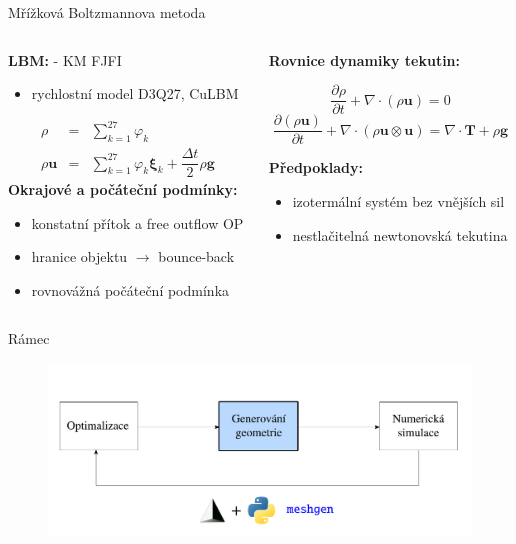 \documentclass[aspectratio=169,xcolor=dvipsnames]{beamer}
\newcommand{\vect}[1]{\mathbf{#1}}
\begin{document}
\begin{frame}{Mřížková Boltzmannova metoda}
	\begin{columns}[T] %
		\begin{column}{.45\textwidth}
			\textbf{LBM:} - KM FJFI\\
			\begin{itemize}
				\item rychlostní model D3Q27, CuLBM
			\end{itemize}
		\begin{eqnarray*}
			\rho &=& \sum_{k=1}^{27} \varphi_{k}\\
			\rho \vect{u} &=& \sum_{k=1}^{27} \varphi_{k} \boldsymbol{\xi}_{k} + \dfrac{\Delta t}{2} \rho \boldsymbol{g}
		\end{eqnarray*}
			\textbf{Okrajové a počáteční podmínky:}\\
			\begin{itemize}
				\item konstatní přítok a free outflow OP
				\item hranice objektu $ \rightarrow $ bounce-back
				\item rovnovážná počáteční podmínka
			\end{itemize}
		\end{column}%
		\begin{column}{.5\textwidth}
			\textbf{Rovnice dynamiky tekutin:}
			\vspace{-13pt}
			\begin{center}
				$$\frac{\partial \rho}{\partial t} + \nabla \cdot (\rho \vect{u}) = 0 $$
				$$\frac{\partial (\rho \vect{u})}{\partial t} + \nabla \cdot (\rho \vect{u} \otimes \vect{u}) = \nabla \cdot \mathbf{T} + \rho \boldsymbol{g}$$
			\end{center}%
			\vspace{11pt}
			\textbf{Předpoklady:}\\[2pt]
			\begin{itemize}
				\item izotermální systém bez vnějších sil
				\item nestlačitelná newtonovská tekutina
			\end{itemize}
		\end{column}%
	\end{columns}
\end{frame}
\begin{frame}{Rámec}
	\addtocounter{framenumber}{-1}
	\begin{figure}
		\includegraphics[width=0.95\linewidth, trim={0 -0.1cm 0 0}, clip]{Images/framework-cz-2.pdf}
	\end{figure}
\end{frame}
\end{document}
